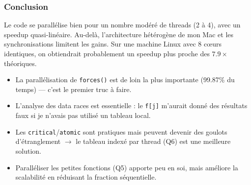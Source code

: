 \documentclass[12pt,a4paper]{article}
\begin{document}
\subsubsection{Conclusion}

Le code se parallélise bien pour un nombre modéré de threads (2 à 4), avec un speedup quasi-linéaire. Au-delà, l'architecture hétérogène de mon Mac et les synchronisations limitent les gains. Sur une machine Linux avec 8 cœurs identiques, on obtiendrait probablement un speedup plus proche des $7.9\times$ théoriques.

\begin{resultbox}
\begin{itemize}[leftmargin=1.5em]
  \item La parallélisation de \texttt{forces()} est de loin la plus importante (99.87\% du temps) --- c'est le premier truc à faire.
  \item L'analyse des data races est essentielle : le \texttt{f[j]} m'aurait donné des résultats faux si je n'avais pas utilisé un tableau local.
  \item Les \texttt{critical}/\texttt{atomic} sont pratiques mais peuvent devenir des goulots d'étranglement $\to$ le tableau indexé par thread (Q6) est une meilleure solution.
  \item Paralléliser les petites fonctions (Q5) apporte peu en soi, mais améliore la scalabilité en réduisant la fraction séquentielle.
\end{itemize}
\end{resultbox}
\end{document}
